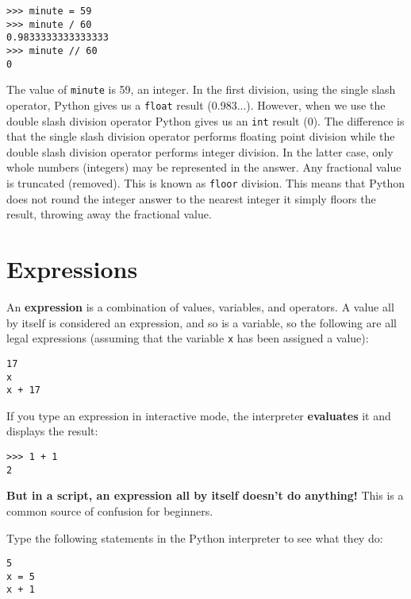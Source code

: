 \beforeverb
\begin{verbatim}
>>> minute = 59
>>> minute / 60
0.9833333333333333
>>> minute // 60
0
\end{verbatim}
\afterverb
%
The value of {\tt minute} is 59, an integer. In the first division, using the single slash operator, Python gives us a {\tt float} result (0.983...). However, when we use the double slash division operator Python gives us an {\tt int} result (0). The difference is that the single slash division operator performs floating point division while the double slash division operator performs integer division. In the latter case, only whole numbers (integers) may be represented in the answer. Any fractional value is truncated (removed). This is known as {\tt floor} division. This means that Python does not round the integer answer to the nearest integer it simply floors the result, throwing away the fractional value.



\section{Expressions}

An {\bf expression} is a combination of values, variables, and operators.
A value all by itself is considered an expression, and so is
a variable, so the following are all legal expressions
(assuming that the variable {\tt x} has been assigned a value):


\beforeverb
\begin{verbatim}
17
x
x + 17
\end{verbatim}
\afterverb
%
If you type an expression in interactive mode, the interpreter
{\bf evaluates} it and displays the result:

\beforeverb
\begin{verbatim}
>>> 1 + 1
2
\end{verbatim}
\afterverb
%
{\bf But in a script, an expression all by itself doesn't
do anything!} This is a common
source of confusion for beginners.

\begin{ex}
Type the following statements in the Python interpreter to see
what they do:

\beforeverb
\begin{verbatim}
5
x = 5
x + 1
\end{verbatim}
\afterverb
%
\end{ex}


